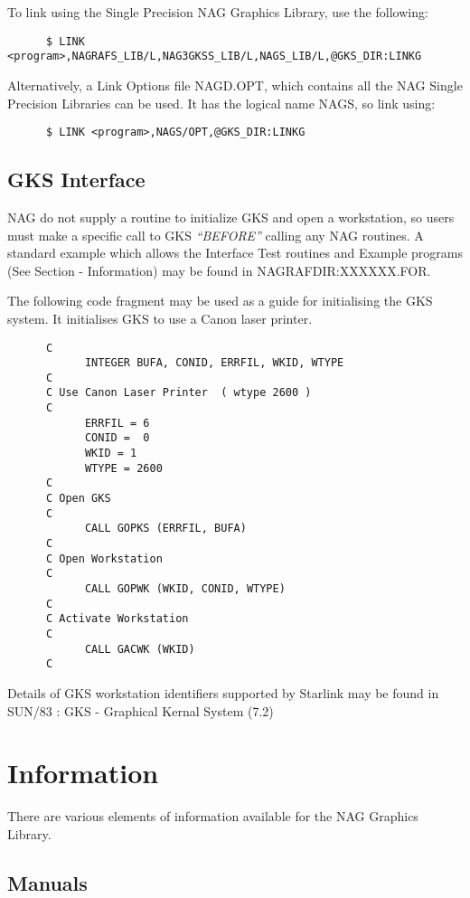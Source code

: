 To link using the Single Precision NAG Graphics Library, use the following:
\begin{verbatim}
      $ LINK <program>,NAGRAFS_LIB/L,NAG3GKSS_LIB/L,NAGS_LIB/L,@GKS_DIR:LINKG
\end{verbatim}
Alternatively, a Link Options file NAGD.OPT, which contains all the NAG Single
Precision Libraries can be used. It has the logical name NAGS, so link using:
\begin{verbatim}
      $ LINK <program>,NAGS/OPT,@GKS_DIR:LINKG
\end{verbatim}

\subsection{GKS Interface}

NAG do not supply a routine to initialize GKS and open a workstation, so users
must make a specific call to GKS {\em ``BEFORE''\/} calling any NAG routines.
A standard example which allows the Interface Test routines and Example
programs (See Section - Information) may be found in NAGRAFDIR:XXXXXX.FOR.

The following code fragment may be used as a guide for initialising the GKS
system. It initialises GKS to use a Canon laser printer.
\begin{verbatim}
      C
            INTEGER BUFA, CONID, ERRFIL, WKID, WTYPE
      C
      C	Use Canon Laser Printer  ( wtype 2600 )
      C
            ERRFIL = 6
            CONID =  0
            WKID = 1
            WTYPE = 2600
      C
      C Open GKS
      C
            CALL GOPKS (ERRFIL, BUFA)
      C
      C Open Workstation
      C
            CALL GOPWK (WKID, CONID, WTYPE)
      C
      C Activate Workstation
      C
            CALL GACWK (WKID)
      C
\end{verbatim}

Details of GKS workstation identifiers supported by Starlink may be found in
SUN/83 : GKS - Graphical Kernal System (7.2)

\section{Information}

There are various elements of information available for the NAG Graphics
Library.

\subsection{Manuals}

